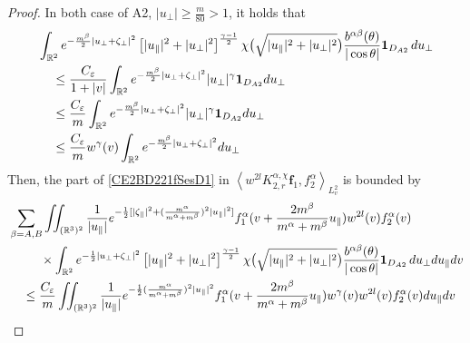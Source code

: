 \documentclass[reqno]{amsart}
\numberwithin{equation}{section}
\numberwithin{equation}{section}
\begin{document}
\begin{proof}
		In both case of A2, $|u_\perp|\geq \frac{m}{80}>1$, it holds that 
		\begin{equation}\label{LinfA2}
			\begin{split}
				&\int_{\mathbb{R}^2} e^{-\frac{m^\beta}{2}|u_{\perp} + \zeta_{\perp}|^2} \left[|u_{\parallel}|^2 + |u_{\perp}|^2\right]^{\frac{\gamma - 1}{2}} \chi\big(\sqrt{|u_{\parallel}|^2 + |u_{\perp}|^2}\big) \frac{b^{ \alpha \beta}(\theta)}{|\cos \theta|}\mathbf{1}_{D_{A2}} \, du_{\perp} \\
				&\hspace{0.4cm}\leq  \frac{C_\varepsilon}{1+|v|}\int_{\mathbb{R}^2} e^{-\frac{m^\beta}{2}|u_\perp + \zeta_\perp|^2} |u_\perp|^{\gamma}\mathbf{1}_{D_{A2}} du_\perp \\
				&\hspace{0.4cm}\leq  \frac{C_\varepsilon}{m}\int_{\mathbb{R}^2} e^{-\frac{m^\beta}{2}|u_\perp + \zeta_\perp|^2} |u_\perp|^{\gamma}\mathbf{1}_{D_{A2}} du_\perp \\
				&\hspace{0.4cm}\leq \frac{C_\varepsilon}{m}w^\gamma(v)\int_{\mathbb{R}^2} e^{-\frac{m^\beta}{2}|u_\perp + \zeta_\perp|^2} du_\perp 
			\end{split}
		\end{equation}
		Then, the part of \eqref{CE2BD221fSesD1} in $\left \langle  w^{2l}K_{2,r}^{\alpha,\chi}\mathbf{f}_1,f^{\alpha}_2\right \rangle_{L^{2}_{v}}$ is bounded by 
		\begin{align}
			& \sum_{\beta=A,B}\iint_{(\mathbb{R}^3)^2} \frac{1}{|u_{\parallel}|} e^{-\frac{1}{2}[|\zeta_{\parallel}|^2+(\frac{m^\alpha}{m^\alpha+m^\beta})^2|u_{\parallel}|^2]} f^\alpha_1(v + \frac{2m^{\beta}}{m^{\alpha}+m^{\beta}}u_{\parallel}) w^{2l}(v)f^\alpha_2(v)\notag\\
			&\hspace{0.9cm} \times \int_{\mathbb{R}^2} e^{-\frac{1}{2}|u_{\perp} + \zeta_{\perp}|^2} \left[|u_{\parallel}|^2 + |u_{\perp}|^2\right]^{\frac{\gamma - 1}{2}} \chi\big(\sqrt{|u_{\parallel}|^2 + |u_{\perp}|^2}\big) \frac{b^{ \alpha \beta}(\theta)}{|\cos \theta|} \mathbf{1}_{D_{A2}}\, du_{\perp} du_{\parallel}dv\notag\\
			&\hspace{0.4cm}\leq \frac{C_\varepsilon}{m} \iint_{(\mathbb{R}^3)^2}\frac{1}{|u_{\parallel}|}e^{-\frac{1}{2}(\frac{m^\alpha}{m^\alpha+m^\beta})^2|u_{\parallel}|^2}f^\alpha_1(v + \frac{2m^{\beta}}{m^{\alpha}+m^{\beta}}u_{\parallel})w^{\gamma}(v) w^{2l}(v)f^\alpha_2(v)du_{\parallel}dv\notag\\

\end{align}
\end{proof}
\end{document}
